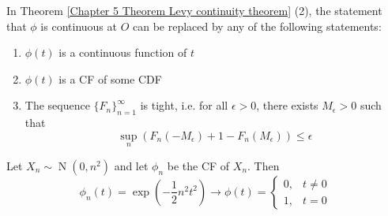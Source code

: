 \documentclass{huhtakm-template-book}
\DeclareMathOperator{\N}{N}
\begin{document}
    \begin{rem}
        In Theorem \ref{Chapter 5 Theorem Levy continuity theorem} (2), the statement that $\phi$ is continuous at $O$ can be replaced by any of the following statements:
        \begin{enumerate}
            \item $\phi(t)$ is a continuous function of $t$
            \item $\phi(t)$ is a CF of some CDF
            \item The sequence $\{F_{n}\}_{n=1}^{\infty}$ is tight, i.e. for all $\epsilon>0$, there exists $M_{\epsilon}>0$ such that
            \begin{equation*}
                \sup_{n}(F_{n}(-M_{\epsilon})+1-F_{n}(M_{\epsilon}))\leq\epsilon
            \end{equation*}
        \end{enumerate}
    \end{rem}
    \begin{eg}
        Let $X_{n}\sim\N(0,n^{2})$ and let $\phi_{n}$ be the CF of $X_{n}$. Then
        \begin{equation*}
            \phi_{n}(t)=\exp\left(-\frac{1}{2}n^{2}t^{2}\right)\to\phi(t)=\begin{cases}
                0, &t\neq 0\\
                1, &t=0
            \end{cases}
        \end{equation*}
    \end{eg}
\end{document}
